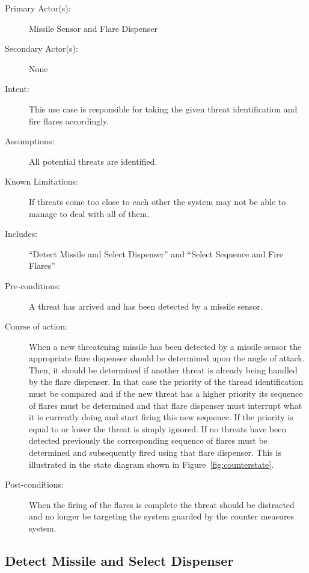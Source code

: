 \documentclass{overturerepchap}
\begin{document}
\begin{description}
\item[Primary Actor(s):] Missile Sensor and Flare Dispenser
\item[Secondary Actor(s):] None
\item[Intent:] This use case is responsible for taking the given
threat identification and fire flares accordingly.
\item[Assumptions:] All potential threats are identified.
\item[Known Limitations:] If threats come too close to each other the
system may not be able to manage to deal with all of them.
\item[Includes:] ``Detect Missile and Select Dispenser'' and ``Select Sequence
and Fire Flares''
\item[Pre-conditions:] A threat has arrived and has been detected by
a missile sensor.
\item[Course of action:] When a new threatening missile has been
detected by a missile sensor the appropriate flare dispenser should be
determined upon the angle of attack. Then, it should be determined if
another threat is already being handled by the flare dispenser. In
that case the priority of the thread identification must be compared
and if the new threat has a higher priority its sequence of flares
must be determined and that flare dispenser must interrupt what it is
currently doing and start firing this new sequence. If the priority is
equal to or lower the threat is simply ignored. If no threats have
been detected previously the corresponding sequence of flares must be
determined and subsequently fired using that flare dispenser. This is
illustrated in the state diagram shown in
Figure~\ref{fig:counterstate}.
\item[Post-conditions:] When the firing of the flares is complete the
threat should be distracted and no longer be targeting the system
guarded by the counter measures system.
\end{description}

\subsection{Detect Missile and Select Dispenser}
\end{document}
